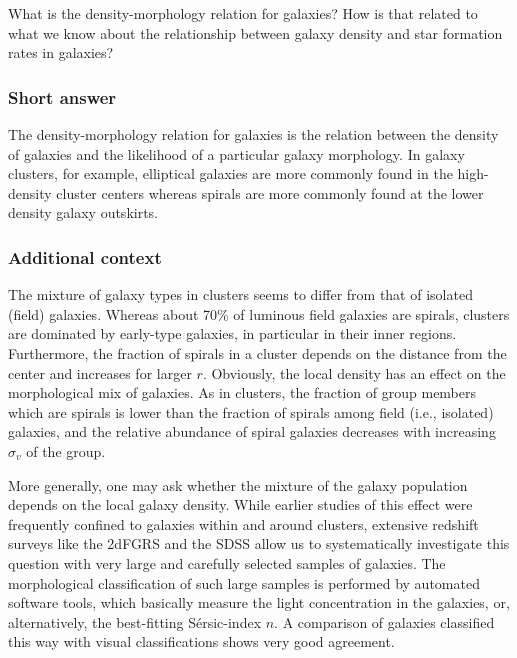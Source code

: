 \documentclass[a4paper,11pt]{article}
\begin{document}
What is the density-morphology relation for galaxies? How is that related to what we know about the relationship between galaxy density and star formation rates in galaxies?

\subsubsection{Short answer}

The density-morphology relation for galaxies is the relation between the density of galaxies and the likelihood of a particular galaxy morphology. In galaxy clusters, for example, elliptical galaxies are more commonly found in the high-density cluster centers whereas spirals are more commonly found at the lower density galaxy outskirts.

\subsubsection{Additional context}

The mixture of galaxy types in clusters seems to differ from that of isolated (field) galaxies. Whereas about 70\% of luminous field galaxies are spirals, clusters are dominated by early-type galaxies, in particular in their inner regions. Furthermore, the fraction of spirals in a cluster depends on the distance from the center and increases for larger $r$. Obviously, the local density has an effect on the morphological mix of galaxies. As in clusters, the fraction of group members which are spirals is lower than the fraction of spirals among field (i.e., isolated) galaxies, and the relative abundance of spiral galaxies decreases with increasing $\sigma_v$ of the group.

{\noindent}More generally, one may ask whether the mixture of the galaxy population depends on the local galaxy density. While earlier studies of this effect were frequently confined to galaxies within and around clusters, extensive redshift surveys like the 2dFGRS and the SDSS allow us to systematically investigate this question with very large and carefully selected samples of galaxies. The morphological classification of such large samples is performed by automated software tools, which basically measure the light concentration in the galaxies, or, alternatively, the best-fitting S\'ersic-index $n$. A comparison of galaxies classified this way with visual classifications shows very good agreement.
\end{document}
